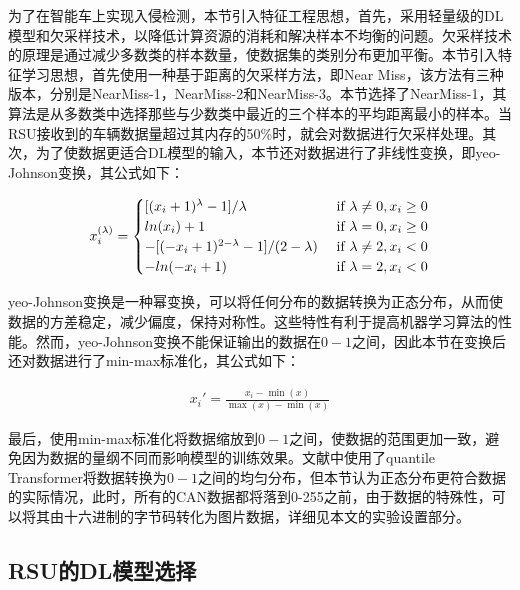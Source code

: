 为了在智能车上实现入侵检测，本节引入特征工程思想，首先，采用轻量级的DL模型和欠采样技术，以降低计算资源的消耗和解决样本不均衡的问题。欠采样技术的原理是通过减少多数类的样本数量，使数据集的类别分布更加平衡。本节引入特征学习思想，首先使用一种基于距离的欠采样方法，即Near Miss\cite{Zhang03}，该方法有三种版本，分别是NearMiss-1，NearMiss-2和NearMiss-3。本节选择了NearMiss-1，其算法是从多数类中选择那些与少数类中最近的三个样本的平均距离最小的样本。当RSU接收到的车辆数据量超过其内存的50\%时，就会对数据进行欠采样处理。其次，为了使数据更适合DL模型的输入，本节还对数据进行了非线性变换，即yeo-Johnson\cite{yeo}变换，其公式如下：

\begin{equation}
\begin{aligned}
x_i^{(\lambda )}=\begin{cases}
 [(x_i+1)^\lambda -1] / \lambda  & \text{ if } \space  \lambda \ne 0,x_i \ge 0 \\
 ln(x_i)+1  & \text{ if } \space  \lambda =  0,x_i \ge 0 \\
 -[(-x_i+1)^{2-\lambda } -1] / (2-\lambda ) & \text{ if } \space  \lambda \ne 2,x_i <  0\\
 -ln(-x_i+1) & \text{ if } \space  \lambda =  2,x_i < 0
\end{cases}
\label{math:yeo}
\end{aligned}
\end{equation}

yeo-Johnson变换是一种幂变换，可以将任何分布的数据转换为正态分布，从而使数据的方差稳定，减少偏度，保持对称性。这些特性有利于提高机器学习算法的性能。然而，yeo-Johnson变换不能保证输出的数据在$0-1$之间，因此本节在变换后还对数据进行了min-max标准化，其公式如下：

\begin{equation}
\begin{aligned}
x_i'=\frac{x_i-\min(x)}{\max(x)-\min(x)}
\label{math:14}
\end{aligned}
\end{equation}

最后，使用min-max标准化将数据缩放到$0-1$之间，使数据的范围更加一致，避免因为数据的量纲不同而影响模型的训练效果。文献\cite{A_Transfer_Learning_and_Optimized_CNN_Based_Intrusion_Detection_System_for_Internet_of_Vehicles}中使用了quantile Transformer将数据转换为$0-1$之间的均匀分布，但本节认为正态分布更符合数据的实际情况，此时，所有的CAN数据都将落到0-255之前，由于数据的特殊性，可以将其由十六进制的字节码转化为图片数据，详细见本文的实验设置部分。

\subsection{RSU的DL模型选择}

